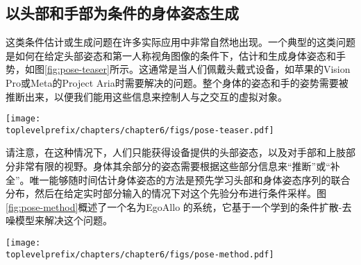 \documentclass[../../book-main.tex]{subfiles}
\begin{document}
\subsection{以头部和手部为条件的身体姿态生成}\label{sub:ego-allo}
这类条件估计或生成问题在许多实际应用中非常自然地出现。一个典型的这类问题是如何在给定头部姿态和第一人称视角图像的条件下，估计和生成身体姿态和手势，如图\ref{fig:pose-teaser}所示。这通常是当人们佩戴头戴式设备，如苹果的Vision Pro或Meta的Project Aria时需要解决的问题。整个身体的姿态和手的姿势需要被推断出来，以便我们能用这些信息来控制人与之交互的虚拟对象。
\begin{figure*}[t]
  \centering
  \texttt{[image: \\toplevelprefix/chapters/chapter6/figs/pose-teaser.pdf]}
    \caption{
一个根据第一人称视角的SLAM姿态和图像（左图）来估计人体身高、姿态和手部参数（中图）的系统。输出捕捉了佩戴者在场景的异我参照系中的动作，我们在这里通过3D重建进行可视化（右图）。
  }
  \label{fig:pose-teaser}

\end{figure*}

请注意，在这种情况下，人们只能获得设备提供的头部姿态，以及对手部和上肢部分非常有限的视野。身体其余部分的姿态需要根据这些部分信息来“推断”或“补全”。唯一能够随时间估计身体姿态的方法是预先学习头部和身体姿态序列的联合分布，然后在给定实时部分输入的情况下对这个先验分布进行条件采样。图\ref{fig:pose-method}概述了一个名为EgoAllo \cite{yi2024egoallo}的系统，它基于一个学到的条件扩散-去噪模型来解决这个问题。
\begin{figure*}[t]
  \centering
  \texttt{[image: \\toplevelprefix/chapters/chapter6/figs/pose-method.pdf]}
\caption{
    \textbf{EgoAllo \cite{yi2024egoallo}技术组件概述。}
    一个扩散模型被预训练，能够根据局部身体参数生成身体姿态序列（中图）。
    SLAM姿态的一个不变参数化$g(\cdot)$（左图）被用来对扩散模型进行条件化。这些参数可以通过全局对齐到输入姿态，从而被放置到全局坐标系中。
    当第一人称视角视频可用时，它被用于通过HaMeR~\cite{pavlakos2023reconstructing}进行手部检测（左图），这可以通过生成的手势进行引导，并融入到样本中。
  }
  \label{fig:pose-method}
\end{figure*}
\end{document}
